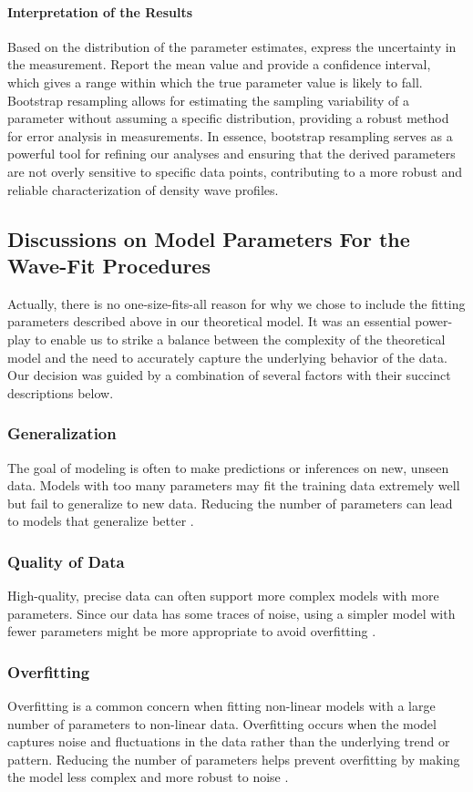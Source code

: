 \documentclass[conference]{IEEEtran}
\begin{document}
\paragraph{Interpretation of the Results}
Based on the distribution of the parameter estimates, express the uncertainty in the measurement. Report the mean value and provide a confidence interval, which gives a range within which the true parameter value is likely to fall. Bootstrap resampling allows for estimating the sampling variability of a parameter without assuming a specific distribution, providing a robust method for error analysis in measurements. In essence, bootstrap resampling serves as a powerful tool for refining our analyses and ensuring that the derived parameters are not overly sensitive to specific data points, contributing to a more robust and reliable characterization of density wave profiles.

\subsection{Discussions on Model Parameters For the Wave-Fit Procedures}
Actually, there is no one-size-fits-all reason for why we chose to include the fitting parameters described above in our theoretical model. It was an essential power-play to enable us to strike a balance between the complexity of the theoretical model and the need to accurately capture the underlying behavior of the data. Our decision was guided by a combination of several factors with their succinct descriptions below.
\subsubsection{Generalization} 
The goal of modeling is often to make predictions or inferences on new, unseen data. Models with too many parameters may fit the training data extremely well but fail to generalize to new data. Reducing the number of parameters can lead to models that generalize better \cite{james2013introduction}.
\subsubsection{Quality of Data} 
High-quality, precise data can often support more complex models with more parameters. Since our data has some traces of noise, using a simpler model with fewer parameters might be more appropriate to avoid overfitting \cite{bishop2006pattern}.
\subsubsection{Overfitting} 
Overfitting is a common concern when fitting non-linear models with a large number of parameters to non-linear data. Overfitting occurs when the model captures noise and fluctuations in the data rather than the underlying trend or pattern. Reducing the number of parameters helps prevent overfitting by making the model less complex and more robust to noise \cite{bishop2006pattern}.
\end{document}
